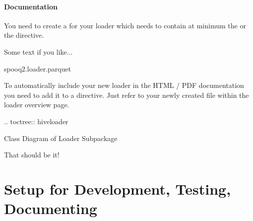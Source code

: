 \documentclass[a4paper,10pt, twoside,english]{sphinxmanual}
\begin{document}
\paragraph{Documentation}
\label{\detokenize{base_classes/loader:documentation}}
You need to create a  for your loader
which needs to contain at minimum the  or the  directive.
\def\sphinxLiteralBlockLabel{\label{\detokenize{base_classes/loader:id4}}}
\begin{sphinxVerbatim}[commandchars=\\\{\}]

Some text if you like...

  spooq2.loader.parquet
\end{sphinxVerbatim}

To automatically include your new loader in the HTML / PDF documentation
you need to add it to a  directive. Just refer to your newly created
 file within the loader overview page.
\def\sphinxLiteralBlockLabel{\label{\detokenize{base_classes/loader:id5}}}
\begin{sphinxVerbatim}[commandchars=\\\{\}]
 .. toctree::
     hive\PYGZus{}loader
 
 Class Diagram of Loader Subpackage
\end{sphinxVerbatim}

That should be it!


\section{Setup for Development, Testing, Documenting}
\label{\detokenize{setup_development_testing:setup-for-development-testing-documenting}}\label{\detokenize{setup_development_testing:dev-setup}}\label{\detokenize{setup_development_testing::doc}}
\end{document}
